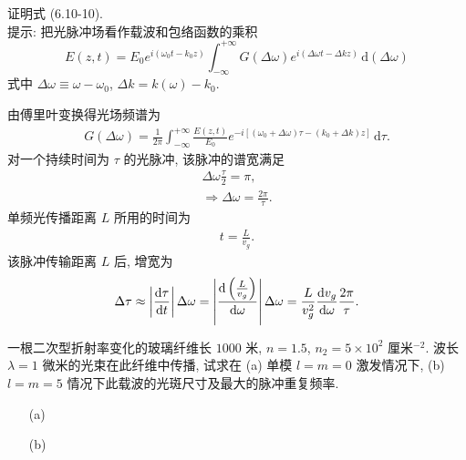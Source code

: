 \documentclass{note}
\begin{document}
\begin{exe}
    证明式 (6.10-10).\\
    提示: 把光脉冲场看作载波和包络函数的乘积
    \[
        E(z,t)=E_0e^{i(\omega_0t-k_0z)}\int_{-\infty}^{+\infty}G(\Delta\omega)e^{i(\Delta\omega t-\Delta kz)}\,\mathrm{d}(\Delta\omega)
    \]
    式中 $\Delta\omega\equiv\omega-\omega_0$, $\Delta k=k(\omega)-k_0$.
\end{exe}
\begin{pf}
    由傅里叶变换得光场频谱为
    \begin{align}
        G(\Delta\omega)=\frac{1}{2\pi}\int_{-\infty}^{+\infty}\frac{E(z,t)}{E_0}e^{-i[(\omega_0+\Delta\omega)\tau-(k_0+\Delta k)z]}\,\mathrm{d}\tau.
    \end{align}
    对一个持续时间为 $\tau$ 的光脉冲, 该脉冲的谱宽满足
    \begin{gather}
        \Delta\omega\frac{\tau}{2}=\pi,\\
        \Longrightarrow\Delta\omega=\frac{2\pi}{\tau}.
    \end{gather}
    单频光传播距离 $L$ 所用的时间为
    \begin{align}
        t=\frac{L}{v_g}.
    \end{align}
    该脉冲传输距离 $L$ 后, 增宽为
    \begin{align}
        \Delta\tau\approx\left\lvert\frac{\mathrm{d}\tau}{\mathrm{d}t}\right\rvert\Delta\omega=\left\lvert\frac{\mathrm{d}\left(\frac{L}{v_g}\right)}{\mathrm{d}\omega}\right\rvert\Delta\omega=\frac{L}{v_g^2}\frac{\mathrm{d}v_g}{\mathrm{d}\omega}\frac{2\pi}{\tau}.
    \end{align}
\end{pf}

\begin{exe}
    一根二次型折射率变化的玻璃纤维长 $1000$ 米, $n=1.5$, $n_2=5\times 10^2$ 厘米${}^{-2}$. 波长 $\lambda=1$ 微米的光束在此纤维中传播, 试求在 (a) 单模 $l=m=0$ 激发情况下, (b) $l=m=5$ 情况下此载波的光斑尺寸及最大的脉冲重复频率.
\end{exe}
\begin{sol}
    \begin{itemize}
        \item[(a)] 
        \item[(b)] 
    \end{itemize}
\end{sol}
\end{document}
